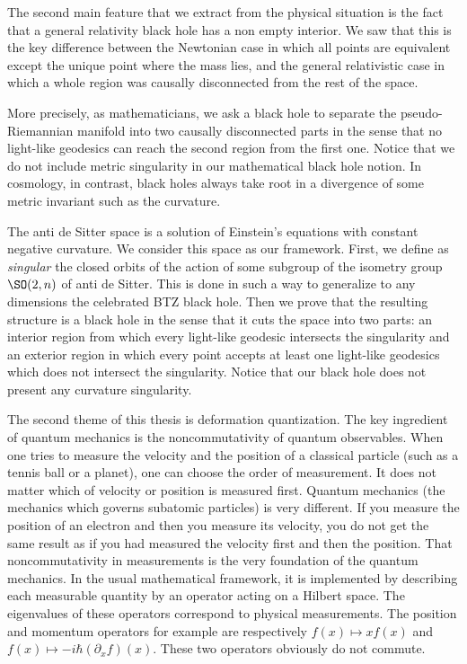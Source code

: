 The second main feature that we extract from the physical situation is the fact that a general relativity black hole has a non empty interior. We saw that this is the key difference between the Newtonian case in which all points are equivalent except the unique point where the mass lies, and the general relativistic case in which a whole region was causally disconnected from the rest of the space.

More precisely, as mathematicians, we ask a black hole to separate the pseudo-Riemannian manifold into two causally disconnected parts in the sense that no light-like geodesics can reach the second region from the first one. Notice that we do not include metric singularity in our mathematical black hole notion. In cosmology, in contrast, black holes always take root in a divergence of some metric invariant such as the curvature.

The anti de Sitter space is a solution of Einstein's equations with constant negative curvature. We consider this space as our framework. First, we define as \emph{singular} the closed orbits of the action of some subgroup of the isometry group $\SO(2,n)$ of anti de Sitter. This is done in such a way to generalize to any dimensions the celebrated BTZ black hole. Then we prove that the resulting structure is a black hole in the sense that it cuts the space into two parts: an interior region from which every light-like geodesic intersects the singularity and an exterior region in which every point accepts at least one light-like geodesics which does not intersect the singularity.  Notice that our black hole does not present any curvature singularity.

The second theme of this thesis is deformation quantization. The key ingredient of quantum mechanics is the noncommutativity of quantum observables. When one tries to measure the velocity and the position of a classical particle (such as a tennis ball or a planet), one can choose the order of measurement. It does not matter which of velocity or position is measured first. Quantum mechanics (the mechanics which governs subatomic particles) is very different. If you measure the position of an electron and then you measure its velocity, you do not get the same result as if you had measured the velocity first and then the position. That noncommutativity in measurements is the very foundation of the quantum mechanics. In the usual mathematical framework, it is implemented by describing each measurable quantity by an operator acting on a Hilbert space. The eigenvalues of these operators correspond to physical measurements. The position and momentum operators for example are respectively $f(x)\mapsto xf(x)$ and $f(x)\mapsto -i\hbar(\partial_xf)(x)$. These two operators obviously do not commute.

